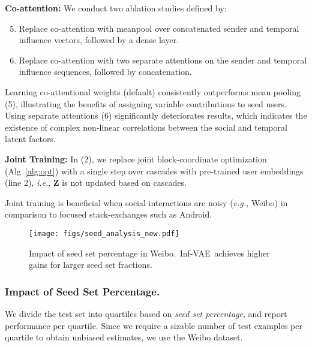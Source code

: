 \documentclass[sigconf]{acmart}
\newcommand{\name}{Inf-VAE}
\def\mZ{{\bm{Z}}}
\begin{document}
\vspace{2pt}
\noindent \textbf{Co-attention:}
We conduct two ablation studies defined by:
\vspace{-3pt}
\begin{enumerate}[leftmargin=*]
\setcounter{enumi}{4}
    \item Replace co-attention with meanpool over concatenated sender and temporal influence vectors, followed by a dense layer.
    \item Replace co-attention with two separate attentions on the sender and temporal influence sequences, followed by concatenation.
\end{enumerate}
\vspace{-3pt}
Learning co-attentional weights (default) consistently outperforms mean pooling (5), illustrating the benefits of assigning variable contributions to seed users. 
Using separate attentions (6) significantly deteriorates results, which indicates 
the existence of complex non-linear correlations between the social and temporal latent factors.

\vspace{2pt}
\noindent \textbf{Joint Training:} In (2), we replace joint block-coordinate optimization (Alg~\ref{alg:opt}) with a single step over cascades with pre-trained user embeddings (line 2), \textit{i.e.}, $\mZ$ is not updated based on cascades.

\noindent 
Joint training is beneficial when social interactions are noisy (\textit{e.g.,} Weibo) in comparison to focused stack-exchanges such as Android.

\begin{figure}[t]
    \centering
    \texttt{[image: figs/seed\_analysis\_new.pdf]}
    \vspace{-25pt}
    \caption{Impact of seed set percentage in Weibo.~\name~achieves higher gains 
    for larger seed set fractions.}
    \label{fig:seed_analysis}
    \vspace{-13pt}
\end{figure}

\subsubsection{\textbf{Impact of Seed Set Percentage.}}
We divide the test set into quartiles based on \textit{seed set percentage}, and report performance per quartile.
Since we require a sizable number of test examples per quartile to obtain unbiased estimates, we use the Weibo dataset. 
\end{document}
